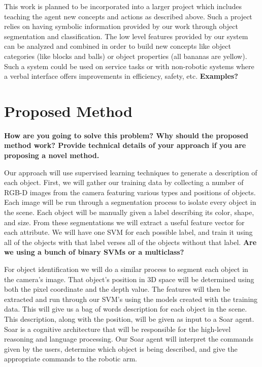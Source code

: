 \documentclass[11pt]{article}
\newcommand{\xxx}[1]{{\bf \color{red} #1}}
\newcommand{\meh}[1]{{\bf \color{blue} #1}}
\begin{document}
This work is planned to be incorporated into a larger project which includes teaching the agent new concepts and actions as described above. Such a project relies on having symbolic information provided by our work through object segmentation and classification. The low level features provided by our system can be analyzed and combined in order to build new concepts like object categories (like blocks and balls) or object properties (all bananas are yellow). Such a system could be used on service tasks or with non-robotic systems where a verbal interface
offers improvements in efficiency, safety, etc. \xxx{Examples?}

\section{Proposed Method}
\xxx{How are you going to solve this problem? Why should the proposed method
    work? Provide technical details of your approach if you are proposing a
    novel method.}

Our approach will use supervised learning techniques to generate a description of each object. First, we will gather our training data by collecting a number of RGB-D images from the camera featuring various types and positions of objects. Each image will be run through a segmentation process to isolate every object in the scene. Each object will be manually given a label describing its color, shape, and size. From these segmentations we will extract a useful feature vector for each attribute. We will have one SVM for each possible label, and train it using all of the objects with that label verses all of the objects without that label. \meh{Are we using a bunch of binary SVMs or a multiclass?}

For object identification we will do a similar process to segment each object in the camera's image. That object's position in 3D space will be determined using both the pixel coordinate and the depth value. The features will then be extracted and run through our SVM's using the models created with the training data. This will give us a bag of words description for each object in the scene. This description, along with the position, will be given as input to a Soar agent. Soar is a cognitive architecture that will be responsible for the high-level reasoning and language processing. Our Soar agent will interpret the commands given by the users, determine which object is being described, and give the appropriate commands to the robotic arm. 
\end{document}

